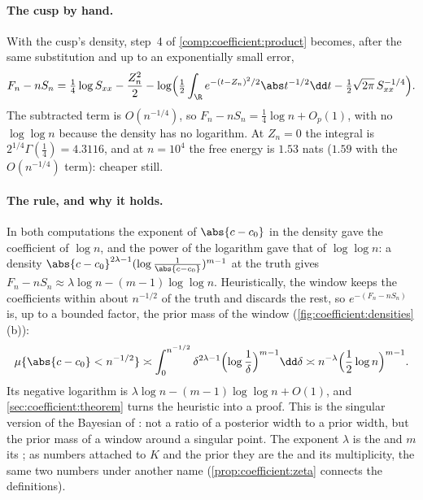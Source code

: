 \begin{refsection}
\paragraph{The cusp by hand.} With the cusp's density, step~4 of \cref{comp:coefficient:product} becomes, after the same substitution and up to an exponentially small error,
\[
F_n-nS_n=\tfrac14\log S_{xx}-\frac{Z_n^2}2-\log\Bigl(\tfrac12\int_\R e^{-(t-Z_n)^2/2}\abs t^{-1/2}\dd t-\tfrac12\sqrt{2\pi}\,S_{xx}^{-1/4}\Bigr).
\]
The subtracted term is $O(n^{-1/4})$, so $F_n-nS_n=\frac14\log n+O_p(1)$, with no $\log\log n$ because the density has no logarithm. At $Z_n=0$ the integral is $2^{1/4}\Gamma(\frac14)=4.3116$, and at $n=10^4$ the free energy is $1.53$ nats ($1.59$ with the $O(n^{-1/4})$ term): cheaper still.

\paragraph{The rule, and why it holds.} In both computations the exponent of $\abs{c-c_0}$ in the density gave the coefficient of $\log n$, and the power of the logarithm gave that of $\log\log n$: a density $\abs{c-c_0}^{2\lambda-1}(\log\frac1{\abs{c-c_0}})^{m-1}$ at the truth gives $F_n-nS_n\approx\lambda\log n-(m-1)\log\log n$. Heuristically, the window keeps the coefficients within about $n^{-1/2}$ of the truth and discards the rest, so $e^{-(F_n-nS_n)}$ is, up to a bounded factor, the prior mass of the window (\cref{fig:coefficient:densities}(b)):
\[
\mu\{\abs{c-c_0}<n^{-1/2}\}\asymp\int_0^{n^{-1/2}}\delta^{2\lambda-1}\Bigl(\log\frac1\delta\Bigr)^{m-1}\dd\delta\asymp n^{-\lambda}\Bigl(\frac12\log n\Bigr)^{m-1}.
\]
Its negative logarithm is $\lambda\log n-(m-1)\log\log n+O(1)$, and \cref{sec:coefficient:theorem} turns the heuristic into a proof. This is the singular version of the Bayesian  of \textcite[ch.~28]{MacKay2003}: not a ratio of a posterior width to a prior width, but the prior mass of a window around a singular point. The exponent $\lambda$ is the  and $m$ its ; as numbers attached to $K$ and the prior they are the  and its multiplicity, the same two numbers under another name (\cref{prop:coefficient:zeta} connects the definitions).


\end{refsection}
